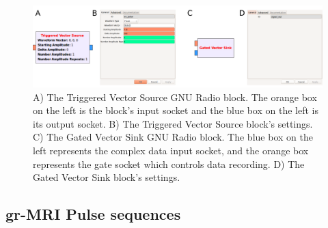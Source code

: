 \documentclass[10pt,letterpaper]{article}
\begin{document}
\begin{figure}[!ht]
\begin{center}
\includegraphics[width = \textwidth,trim=0 0 0 0,clip=false]{custom_blocks.png}
\caption{A) The Triggered Vector Source GNU Radio block.  
The orange box on the left is the block's input socket and the blue box on the left is its output socket. 
B) The Triggered Vector Source block's settings.  
C) The Gated Vector Sink GNU Radio block.  
The blue box on the left represents the complex data input socket, 
and the orange box represents the gate socket which controls data recording. 
D) The Gated Vector Sink block's settings.}
\label{fig:tvs}
\end{center}
\end{figure}

\subsection*{gr-MRI Pulse sequences}
\end{document}
